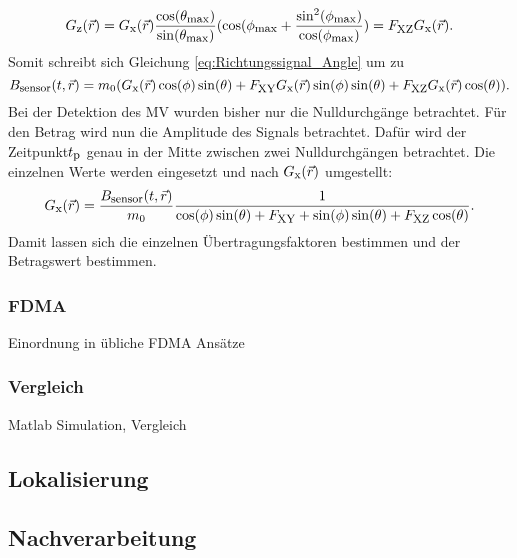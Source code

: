 \begin{equation}
    G_{\textrm{\footnotesize{z}}}(\vec{r}) = G_{\textrm{\footnotesize{x}}}(\vec{r}) \frac{\cos(\theta_{\textrm{\footnotesize{max}}})}{\sin(\theta_{\textrm{\footnotesize{max}}})} (\cos(\phi_{\textrm{\footnotesize{max}}}+\frac{\sin^2(\phi_{\textrm{\footnotesize{max}}})}{\cos(\phi_{\textrm{\footnotesize{max}}})}) = F_{\textrm{\footnotesize{XZ}}}G_{\textrm{\footnotesize{x}}}(\vec{r}).
    \label{eq:FaktorXZ}
\end{equation}
Somit schreibt sich Gleichung \ref{eq:Richtungssignal_Angle} um zu 
\begin{equation}
    B_{\textrm{\footnotesize{sensor}}}(t,\vec{r}) = m_0 ( G_{\textrm{\footnotesize{x}}}(\vec{r}) \cos(\phi ) \sin(\theta ) + F_{\textrm{\footnotesize{XY}}}G_{\textrm{\footnotesize{x}}}(\vec{r}) \sin(\phi)\sin(\theta) + F_{\textrm{\footnotesize{XZ}}}G_{\textrm{\footnotesize{x}}}(\vec{r}) \cos(\theta)).
\end{equation}
Bei der Detektion des MV wurden bisher nur die Nulldurchgänge betrachtet. Für den Betrag wird nun die Amplitude des Signals betrachtet. Dafür wird der Zeitpunkt$t_{\textrm{\footnotesize{p}}}$ genau in der Mitte zwischen zwei Nulldurchgängen betrachtet. Die einzelnen Werte werden eingesetzt und nach $G_{\textrm{\footnotesize{x}}}(\vec{r})$ umgestellt:
\begin{equation}
    G_{\textrm{\footnotesize{x}}}(\vec{r}) = \frac{B_{\textrm{\footnotesize{sensor}}}(t,\vec{r})}{m_0} \frac{1}{\cos(\phi ) \sin(\theta )+F_{\textrm{\footnotesize{XY}}}+\sin(\phi)\sin(\theta)+F_{\textrm{\footnotesize{XZ}}}\cos(\theta)} .
\end{equation}
Damit lassen sich die einzelnen Übertragungsfaktoren bestimmen und der Betragswert bestimmen. 

\subsubsection{FDMA}
Einordnung in übliche FDMA Ansätze
\subsubsection{Vergleich}
Matlab Simulation, Vergleich 
  \subsection{Lokalisierung}
  \subsection{Nachverarbeitung}

     
         
      